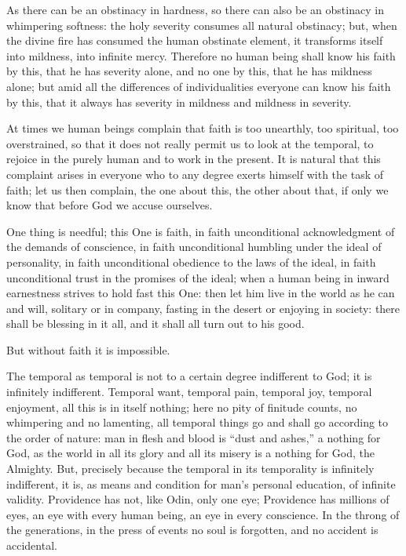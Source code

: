 \documentclass[12pt,a4paper,openany]{book}
\newcommand{\opage}[1]{\marginnote{\footnotesize\textit{[#1]}}}
\begin{document}
As there can be an obstinacy in
hardness, so there can also be an obstinacy in whimpering softness: the holy
severity consumes all natural obstinacy;
\setcounter{footnote}{0}%
\opage{81}but, when the divine fire has consumed
the human obstinate element, it transforms itself
into mildness, into infinite mercy. Therefore
no human being shall know his faith by this, that
he has severity alone, and no one by this,
that he has mildness alone; but amid all the
differences of individualities everyone can
know his faith by this, that it always has severity
in mildness and mildness in severity.

At times we human beings complain that faith
is too unearthly, too spiritual, too overstrained,
so that it does not really permit us to look at the
temporal, to rejoice in the purely human
and to work in the present. It is natural
that this complaint arises in everyone
who to any degree exerts himself with the task
of faith; let us then complain, the one about this,
the other about that, if only we know that
before God we accuse ourselves.

One thing is needful; this One is faith, in
faith unconditional acknowledgment of the demands of
conscience, in faith unconditional humbling
under the ideal of personality, in faith
unconditional obedience to the laws of the ideal, in faith
unconditional trust in the promises of the ideal; when
\setcounter{footnote}{0}%
\opage{82}a human being in inward earnestness strives to hold fast
this One: then let him live in the world as
he can and will, solitary or in company, fasting
in the desert or enjoying in society: there shall
be blessing in it all, and it shall
all turn out to his good.

But without faith it is impossible.

The temporal as temporal is not to a certain
degree indifferent to God; it is infinitely indifferent.
Temporal want, temporal pain, temporal
joy, temporal enjoyment, all this is in itself
nothing; here no pity of finitude counts,
no whimpering and no lamenting, all
temporal things go and shall go according to the order of nature:
man in flesh and blood is ``dust
and ashes,'' a nothing for God, as the world in all
its glory and all its misery is a
nothing for God, the Almighty. But, precisely because
the temporal in its temporality is infinitely indifferent,
it is, as means and condition for
man's personal education, of infinite
validity. Providence has not, like Odin, only
one eye; Providence has millions of eyes, an
eye with every human being, an eye in every conscience.
In the throng of the generations, in the press of
\setcounter{footnote}{0}%
\opage{83}events no soul is forgotten, and
no accident is accidental.
\end{document}
